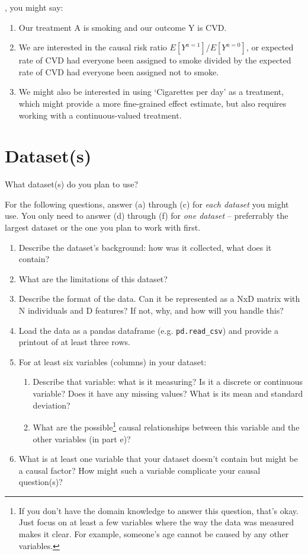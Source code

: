 \documentclass[12pt]{article}
\begin{document}
, you might say:
\begin{enumerate}[itemsep=0em,label={(\alph*)}]
\item Our treatment A is smoking and our outcome Y is CVD.
\item We are interested in the causal risk ratio $E[Y^{a=1}] / E[Y^{a=0}]$, or
expected rate of CVD had everyone been assigned to smoke divided by the
expected rate of CVD had everyone been assigned not to smoke.
\item We might also be interested in using `Cigarettes per day' as a treatment,
which might provide a more fine-grained effect estimate, but also requires
working with a continuous-valued treatment.
\end{enumerate}

\clearpage

\section{Dataset(s)}

\noindent What dataset(s) do you plan to use?

For the following questions, answer (a) through (c) for \emph{each dataset} you
might use. You only need to answer (d) through (f) for \emph{one dataset} --
preferrably the largest dataset or the one you plan to work with first.

\begin{enumerate}[itemsep=0em,label={(\alph*)}]
\item Describe the dataset's background: how was it collected, what does it contain?
\item What are the limitations of this dataset? 
\item Describe the format of the data. Can it be represented as a NxD matrix with N individuals and D features? If not, why, and how will you handle this?
\item Load the data as a pandas dataframe (e.g. {\tt pd.read\_csv}) and provide a printout of at least three rows.
\item For at least six variables (columns) in your dataset:
  \begin{enumerate}[itemsep=0em,label={\roman*.}]
     \item Describe that variable: what is it measuring? Is it a discrete or continuous variable? Does it have any missing values? What is its mean and standard deviation?
     \item What are the possible\footnote{If you don't have the domain knowledge to answer this question, that's okay. Just focus on at least a few variables where the way the data was measured makes it clear. For example, someone's age cannot be caused by any other variables.} causal relationships between this variable and the other variables (in part e)?
  \end{enumerate}
\item What is at least one variable that your dataset doesn't contain but might be a causal factor? How might such a variable complicate your causal question(s)?
\end{enumerate}
\end{document}
